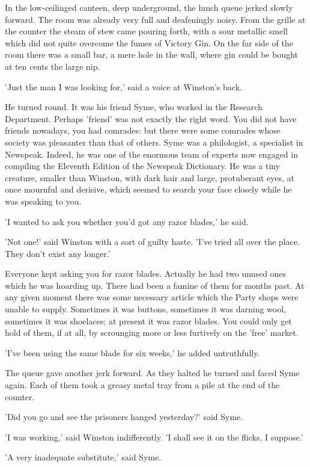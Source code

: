 \documentclass{article}
\begin{document}
In the low-ceilinged canteen, deep underground, the lunch queue jerked
slowly forward. The room was already very full and deafeningly noisy. From
the grille at the counter the steam of stew came pouring forth, with a sour
metallic smell which did not quite overcome the fumes of Victory Gin. On
the far side of the room there was a small bar, a mere hole in the wall,
where gin could be bought at ten cents the large nip.

'Just the man I was looking for,' said a voice at Winston's back.

He turned round. It was his friend Syme, who worked in the Research
Department. Perhaps 'friend' was not exactly the right word. You did not
have friends nowadays, you had comrades: but there were some comrades whose
society was pleasanter than that of others. Syme was a philologist, a
specialist in Newspeak. Indeed, he was one of the enormous team of experts
now engaged in compiling the Eleventh Edition of the Newspeak Dictionary.
He was a tiny creature, smaller than Winston, with dark hair and large,
protuberant eyes, at once mournful and derisive, which seemed to search
your face closely while he was speaking to you.

'I wanted to ask you whether you'd got any razor blades,' he said.

'Not one!' said Winston with a sort of guilty haste. 'I've tried all over
the place. They don't exist any longer.'

Everyone kept asking you for razor blades. Actually he had two unused ones
which he was hoarding up. There had been a famine of them for months past.
At any given moment there was some necessary article which the Party shops
were unable to supply. Sometimes it was buttons, sometimes it was darning
wool, sometimes it was shoelaces; at present it was razor blades. You could
only get hold of them, if at all, by scrounging more or less furtively on
the 'free' market.

'I've been using the same blade for six weeks,' he added untruthfully.

The queue gave another jerk forward. As they halted he turned and faced
Syme again. Each of them took a greasy metal tray from a pile at the end
of the counter.

'Did you go and see the prisoners hanged yesterday?' said Syme.

'I was working,' said Winston indifferently. 'I shall see it on the
flicks, I suppose.'

'A very inadequate substitute,' said Syme.
\end{document}
